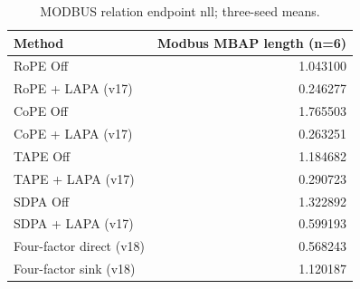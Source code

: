 \begin{table}[t]
\centering
\scriptsize
\caption{MODBUS relation endpoint nll; three-seed means.}
\begin{tabular}{lr}
\toprule
Method & Modbus MBAP length (n=6) \\
\midrule
RoPE Off & 1.043100 \\
RoPE + LAPA (v17) & 0.246277 \\
CoPE Off & 1.765503 \\
CoPE + LAPA (v17) & 0.263251 \\
TAPE Off & 1.184682 \\
TAPE + LAPA (v17) & 0.290723 \\
SDPA Off & 1.322892 \\
SDPA + LAPA (v17) & 0.599193 \\
Four-factor direct (v18) & 0.568243 \\
Four-factor sink (v18) & 1.120187 \\
\bottomrule
\end{tabular}
\end{table}
